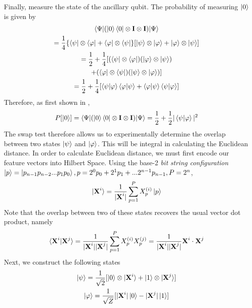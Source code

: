 \documentclass[twocolumn, english]{revtex4-2}
\begin{document}
Finally, measure the state of the ancillary qubit. The probability of measuring $\ket{0}$ is given by 
\begin{equation}\begin{gathered}
\braket{\Psi|(\ket{0}\bra{0}\otimes\textbf{I}\otimes\textbf{I})|\Psi}\\=\frac{1}{4}\{\bra{\psi}\otimes\bra{\varphi}+\bra{\varphi}\otimes\bra{\psi}\}[\ket{\psi}\otimes\ket{\varphi}+\ket{\varphi}\otimes\ket{\psi}]\\
=\frac{1}{2}+\frac{1}{4}[(\bra{\psi}\otimes\bra{\varphi})(\ket{\varphi}\otimes\ket{\psi})\\+(\bra{\varphi}\otimes\bra{\psi})(\ket{\psi}\otimes\ket{\varphi})]\\
=\frac{1}{2}+\frac{1}{4}[\braket{\psi|\varphi}\braket{\varphi|\psi}+\braket{\varphi|\psi}\braket{\psi|\varphi}]
\end{gathered}\end{equation}
Therefore, as first shown in \cite{quantumworld},
\begin{equation}
P[\ket{0}] = \braket{\Psi|(\ket{0}\bra{0}\otimes\textbf{I}\otimes\textbf{I})|\Psi} = \frac{1}{2}+\frac{1}{2}|\braket{\psi|\varphi}|^2
\end{equation}
The swap test therefore allows us to experimentally determine the overlap between two states $\ket{\psi}$ and $\ket{\varphi}$. This will be integral in calculating the Euclidean distance. In order to calculate Euclidean distance, we must first encode our feature vectors into Hilbert Space. Using the base-2 \textit{bit string configuration} $\ket{p}=\ket{p_{n-1}p_{n-2}...p_{1}p_{0}}, p=2^{0}p_{0}+2^{1}p_{1}+...2^{n-1}p_{n-1}, P=2^{n}$,
\begin{equation}
\ket{\textbf{X}^i} = \frac{1}{|\textbf{X}^i|}\sum_{p=1}^{P} X_{p}^{(i)}\ket{p}
\end{equation}
Note that the overlap between two of these states recovers the usual vector dot product, namely
\begin{equation}
\braket{\textbf{X}^{i}|\textbf{X}^{j}}=\frac{1}{|\textbf{X}^{i}||\textbf{X}^{j}|}\sum_{p=1}^{P}X_{p}^{(i)}X_{p}^{(j)}=\frac{1}{|\textbf{X}^{i}||\textbf{X}^{j}|}\textbf{X}^{i}\cdot\textbf{X}^{j}
\end{equation}
Next, we construct the following states
\begin{equation}\begin{gathered}
\ket{\psi}=\frac{1}{\sqrt{2}}[\ket{0}\otimes\ket{\textbf{X}^{i}}+\ket{1}\otimes\ket{\textbf{X}^{j}}]\\
\ket{\varphi}=\frac{1}{\sqrt{Z}}[|\textbf{X}^{i}|\ket{0} - |\textbf{X}^{j}|\ket{1}]
\end{gathered}\end{equation}
\end{document}
